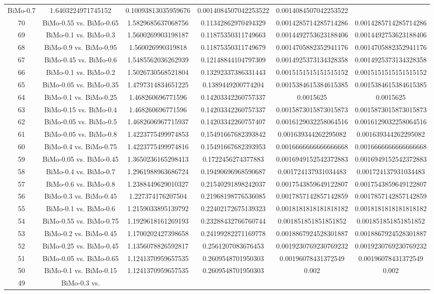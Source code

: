 \documentclass[a4paper,10pt]{article}
\begin{document}
\begin{landscape}
\begin{table}[!htp]
\begin{tabular}{cccccc}
BiMo-0.7&1.6403224971745152&0.10093813035959676&0.0014084507042253522&0.0014084507042253522\\70&BiMo-0.55 vs. BiMo-0.65&1.5829685637068756&0.11342862970494329&0.0014285714285714286&0.0014285714285714286\\69&BiMo-0.1 vs. BiMo-0.3&1.5600269903198187&0.11875350311749663&0.0014492753623188406&0.0014492753623188406\\68&BiMo-0.9 vs. BiMo-0.95&1.560026990319818&0.11875350311749679&0.0014705882352941176&0.0014705882352941176\\67&BiMo-0.45 vs. BiMo-0.6&1.5485562036262939&0.12148844104797309&0.0014925373134328358&0.0014925373134328358\\66&BiMo-0.1 vs. BiMo-0.2&1.5026730568521804&0.13292337386331443&0.0015151515151515152&0.0015151515151515152\\65&BiMo-0.05 vs. BiMo-0.35&1.4797314834651225&0.1389449200774204&0.0015384615384615385&0.0015384615384615385\\64&BiMo-0.1 vs. BiMo-0.25&1.468260696771596&0.14203342260757337&0.0015625&0.0015625\\63&BiMo-0.15 vs. BiMo-0.4&1.468260696771596&0.14203342260757337&0.0015873015873015873&0.0015873015873015873\\62&BiMo-0.05 vs. BiMo-0.5&1.4682606967715937&0.14203342260757407&0.0016129032258064516&0.0016129032258064516\\61&BiMo-0.05 vs. BiMo-0.8&1.4223775499974853&0.15491667682393842&0.001639344262295082&0.001639344262295082\\60&BiMo-0.4 vs. BiMo-0.75&1.4223775499974816&0.15491667682393953&0.0016666666666666668&0.0016666666666666668\\59&BiMo-0.05 vs. BiMo-0.45&1.3650236165298413&0.1722456274377883&0.0016949152542372883&0.0016949152542372883\\58&BiMo-0.4 vs. BiMo-0.7&1.2961988963686724&0.19490696968590687&0.001724137931034483&0.001724137931034483\\57&BiMo-0.6 vs. BiMo-0.8&1.2388449629010327&0.21540291898242037&0.0017543859649122807&0.0017543859649122807\\56&BiMo-0.3 vs. BiMo-0.45&1.227374176207504&0.21968198776536085&0.0017857142857142859&0.0017857142857142859\\55&BiMo-0.1 vs. BiMo-0.6&1.2159033895139792&0.22402172675139323&0.0018181818181818182&0.0018181818181818182\\54&BiMo-0.55 vs. BiMo-0.75&1.1929618161269193&0.23288432766760744&0.001851851851851852&0.001851851851851852\\53&BiMo-0.2 vs. BiMo-0.45&1.1700202427398658&0.24199282271169778&0.0018867924528301887&0.0018867924528301887\\52&BiMo-0.25 vs. BiMo-0.45&1.1356078826592817&0.2561207083676453&0.0019230769230769232&0.0019230769230769232\\51&BiMo-0.05 vs. BiMo-0.65&1.1241370959657535&0.2609548701950303&0.00196078431372549&0.00196078431372549\\50&BiMo-0.1 vs. BiMo-0.15&1.1241370959657535&0.2609548701950303&0.002&0.002\\49&BiMo-0.3 vs. 
\end{tabular}
\end{table}
\end{landscape}
\end{document}
